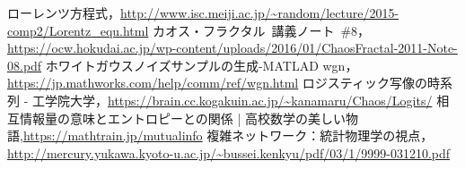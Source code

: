 \documentclass[autodetect-engine,dvipdfmx-if-dvi,ja=standard,a4paper,11pt]{bxjsarticle} %
\begin{document}









\begin{thebibliography}{9999}%
ローレンツ方程式，\url{http://www.isc.meiji.ac.jp/~random/lecture/2015-comp2/Lorentz_equ.html}
カオス・フラクタル\ 講義ノート\ \#8，\url{https://ocw.hokudai.ac.jp/wp-content/uploads/2016/01/ChaosFractal-2011-Note-08.pdf}
ホワイトガウスノイズサンプルの生成-MATLAD wgn，\url{https://jp.mathworks.com/help/comm/ref/wgn.html}
ロジスティック写像の時系列 - 工学院大学，\url{https://brain.cc.kogakuin.ac.jp/~kanamaru/Chaos/Logits/}
相互情報量の意味とエントロピーとの関係 | 高校数学の美しい物語,\url{https://mathtrain.jp/mutualinfo}
複雑ネットワーク：統計物理学の視点，\url{http://mercury.yukawa.kyoto-u.ac.jp/~bussei.kenkyu/pdf/03/1/9999-031210.pdf}
\end{thebibliography}

\end{document}
